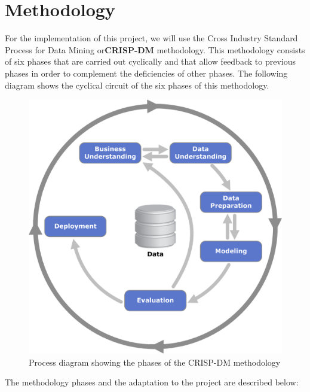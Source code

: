 \section{Methodology}


For the implementation of this project, we will use the Cross Industry Standard Process for Data Mining or\textbf{CRISP-DM} methodology. This methodology consists of six phases that are carried out cyclically and that allow feedback to previous phases in order to complement the deficiencies of other phases. The following diagram shows the cyclical circuit of the six phases of this methodology.

\begin{figure}[h]
    \begin{center}
        \includegraphics[scale=0.40]{images/CRISP-DM_Process_Diagram.png}
        \caption{Process diagram showing the phases of the CRISP-DM methodology}
    \label{fig:CRISP-DM}    
    \end{center}
\end{figure}

The methodology phases and the adaptation to the project are described below:

